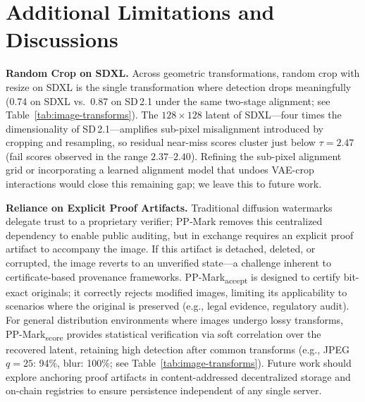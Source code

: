 \documentclass{article}
\theoremstyle{plain}
\theoremstyle{definition}
\theoremstyle{remark}
\begin{document}

\section{Additional Limitations and Discussions}\label{Additional Limitations and Discussions}

\textbf{Random Crop on SDXL.}\enspace
Across geometric transformations, random crop with resize on SDXL is the single transformation where detection drops meaningfully (0.74 on SDXL vs.\ 0.87 on SD\,2.1 under the same two-stage alignment; see Table~\ref{tab:image-transforms}).
The $128{\times}128$ latent of SDXL---four times the dimensionality of SD\,2.1---amplifies sub-pixel misalignment introduced by cropping and resampling, so residual near-miss scores cluster just below $\tau{=}2.47$ (fail scores observed in the range $2.37$--$2.40$).
Refining the sub-pixel alignment grid or incorporating a learned alignment model that undoes VAE-crop interactions would close this remaining gap; we leave this to future work.

\textbf{Reliance on Explicit Proof Artifacts.}\enspace
Traditional diffusion watermarks delegate trust to a proprietary verifier; PP-Mark removes this centralized dependency to enable public auditing, but in exchange requires an explicit proof artifact to accompany the image.
If this artifact is detached, deleted, or corrupted, the image reverts to an unverified state---a challenge inherent to certificate-based provenance frameworks.
PP-Mark\textsubscript{accept} is designed to certify bit-exact originals; it correctly rejects modified images, limiting its applicability to scenarios where the original is preserved (e.g., legal evidence, regulatory audit).
For general distribution environments where images undergo lossy transforms, PP-Mark\textsubscript{score} provides statistical verification via soft correlation over the recovered latent, retaining high detection after common transforms (e.g., JPEG $q{=}25$: 94\%, blur: 100\%; see Table~\ref{tab:image-transforms}).
Future work should explore anchoring proof artifacts in content-addressed decentralized storage and on-chain registries to ensure persistence independent of any single server.

\end{document}

